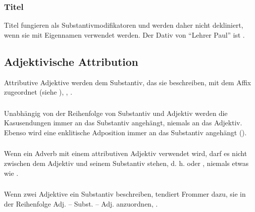 \subsubsection{Titel} Titel fungieren als Substantivmodifikatoren und werden daher nicht dekliniert, wenn sie mit Eigennamen verwendet werden. Der Dativ von  ``Lehrer Paul'' ist . 

\subsection{Adjektivische Attribution} Attributive Adjektive werden dem Substantiv, das sie beschreiben, mit dem Affix  zugeordnet (siehe ),  ,  . \label{syn:adj:attr}

\subsubsection{} Unabhängig von der Reihenfolge von Substantiv und Adjektiv werden die Kasusendungen immer an das Substantiv angehängt, niemals an das Adjektiv. Ebenso wird eine enklitische Adposition immer an das Substantiv angehängt
().

\subsubsection{} Wenn ein Adverb mit einem attributiven Adjektiv verwendet wird, darf es nicht zwischen dem Adjektiv und seinem Substantiv stehen, d. h.   oder , niemals etwas wie .

\subsubsection{} Wenn zwei Adjektive ein Substantiv beschreiben, tendiert Frommer dazu, sie in der Reihenfolge Adj. -- Subst. -- Adj. anzuordnen,  .

